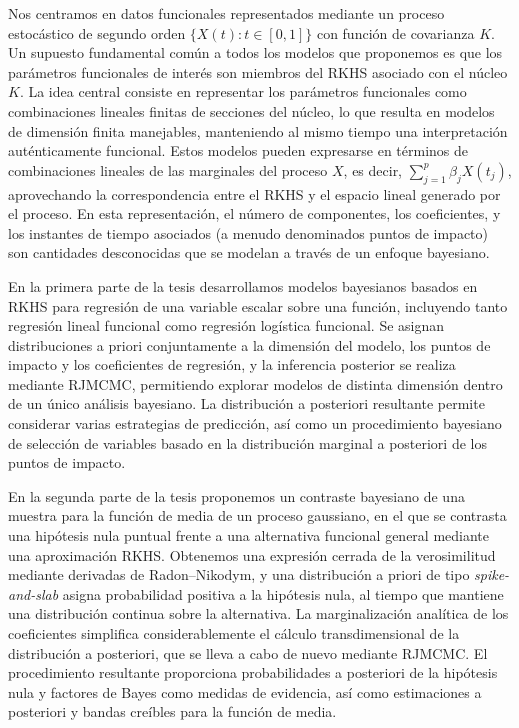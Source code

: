 Nos centramos en datos funcionales representados mediante un proceso estocástico de segundo orden \(\{X(t): t\in[0,1]\}\) con función de covarianza \(K\). Un supuesto fundamental común a todos los modelos que proponemos es que los parámetros funcionales de interés son miembros del \acs{RKHS} asociado con el núcleo \(K\). La idea central consiste en representar los parámetros funcionales como combinaciones lineales finitas de secciones del núcleo, lo que resulta en modelos de dimensión finita manejables, manteniendo al mismo tiempo una interpretación auténticamente funcional. Estos modelos pueden expresarse en términos de combinaciones lineales de las marginales del proceso \(X\), es decir, \(\sum_{j=1}^p \beta_j X(t_j)\), aprovechando la correspondencia entre el \acs{RKHS} y el espacio lineal generado por el proceso. En esta representación, el número de componentes, los coeficientes, y los instantes de tiempo asociados (a menudo denominados puntos de impacto) son cantidades desconocidas que se modelan a través de un enfoque bayesiano.

En la primera parte de la tesis desarrollamos modelos bayesianos basados en \acs{RKHS} para regresión de una variable escalar sobre una función, incluyendo tanto regresión lineal funcional como regresión logística funcional. Se asignan distribuciones a priori conjuntamente a la dimensión del modelo, los puntos de impacto y los coeficientes de regresión, y la inferencia posterior se realiza mediante \acs{RJMCMC}, permitiendo explorar modelos de distinta dimensión dentro de un único análisis bayesiano. La distribución a posteriori resultante permite considerar varias estrategias de predicción, así como un procedimiento bayesiano de selección de variables basado en la distribución marginal a posteriori de los puntos de impacto.

En la segunda parte de la tesis proponemos un contraste bayesiano de una muestra para la función de media de un proceso gaussiano, en el que se contrasta una hipótesis nula puntual frente a una alternativa funcional general mediante una aproximación \acs{RKHS}. Obtenemos una expresión cerrada de la verosimilitud mediante derivadas de Radon--Nikodym, y una distribución a priori de tipo \textit{spike-and-slab} asigna probabilidad positiva a la hipótesis nula, al tiempo que mantiene una distribución continua sobre la alternativa. La marginalización analítica de los coeficientes simplifica considerablemente el cálculo transdimensional de la distribución a posteriori, que se lleva a cabo de nuevo mediante \acs{RJMCMC}. El procedimiento resultante proporciona probabilidades a posteriori de la hipótesis nula y factores de Bayes como medidas de evidencia, así como estimaciones a posteriori y bandas creíbles para la función de media.

